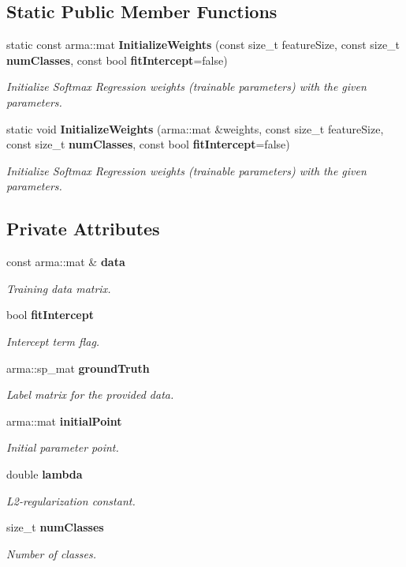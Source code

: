 \subsection*{Static Public Member Functions}
\begin{DoxyCompactItemize}
\item 
static const arma\+::mat {\bf Initialize\+Weights} (const size\+\_\+t feature\+Size, const size\+\_\+t {\bf num\+Classes}, const bool {\bf fit\+Intercept}=false)
\begin{DoxyCompactList}\small\item\em Initialize Softmax Regression weights (trainable parameters) with the given parameters. \end{DoxyCompactList}\item 
static void {\bf Initialize\+Weights} (arma\+::mat \&weights, const size\+\_\+t feature\+Size, const size\+\_\+t {\bf num\+Classes}, const bool {\bf fit\+Intercept}=false)
\begin{DoxyCompactList}\small\item\em Initialize Softmax Regression weights (trainable parameters) with the given parameters. \end{DoxyCompactList}\end{DoxyCompactItemize}
\subsection*{Private Attributes}
\begin{DoxyCompactItemize}
\item 
const arma\+::mat \& {\bf data}
\begin{DoxyCompactList}\small\item\em Training data matrix. \end{DoxyCompactList}\item 
bool {\bf fit\+Intercept}
\begin{DoxyCompactList}\small\item\em Intercept term flag. \end{DoxyCompactList}\item 
arma\+::sp\+\_\+mat {\bf ground\+Truth}
\begin{DoxyCompactList}\small\item\em Label matrix for the provided data. \end{DoxyCompactList}\item 
arma\+::mat {\bf initial\+Point}
\begin{DoxyCompactList}\small\item\em Initial parameter point. \end{DoxyCompactList}\item 
double {\bf lambda}
\begin{DoxyCompactList}\small\item\em L2-\/regularization constant. \end{DoxyCompactList}\item 
size\+\_\+t {\bf num\+Classes}
\begin{DoxyCompactList}\small\item\em Number of classes. \end{DoxyCompactList}\end{DoxyCompactItemize}


